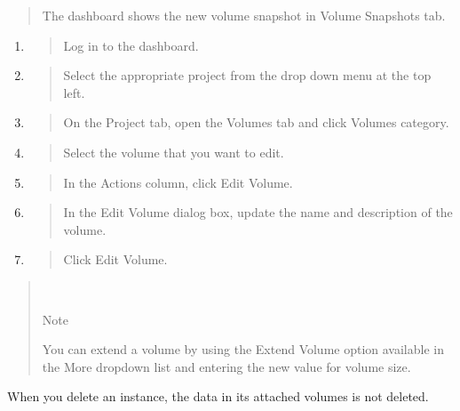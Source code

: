 \begin{quote}
The dashboard shows the new volume snapshot in Volume Snapshots tab.
\end{quote}

\label{edit-a-volume}

\begin{enumerate}
\def\labelenumi{\arabic{enumi}.}
\item
  \begin{quote}
  Log in to the dashboard.
  \end{quote}
\item
  \begin{quote}
  Select the appropriate project from the drop down menu at the top
  left.
  \end{quote}
\item
  \begin{quote}
  On the Project tab, open the Volumes tab and click Volumes category.
  \end{quote}
\item
  \begin{quote}
  Select the volume that you want to edit.
  \end{quote}
\item
  \begin{quote}
  In the Actions column, click Edit Volume.
  \end{quote}
\item
  \begin{quote}
  In the Edit Volume dialog box, update the name and description of the
  volume.
  \end{quote}
\item
  \begin{quote}
  Click Edit Volume.
  \end{quote}
\end{enumerate}

\begin{quote}
~

Note

You can extend a volume by using the Extend Volume option available in
the More dropdown list and entering the new value for volume size.
\end{quote}

\label{delete-a-volume}

When you delete an instance, the data in its attached volumes is not
deleted.

